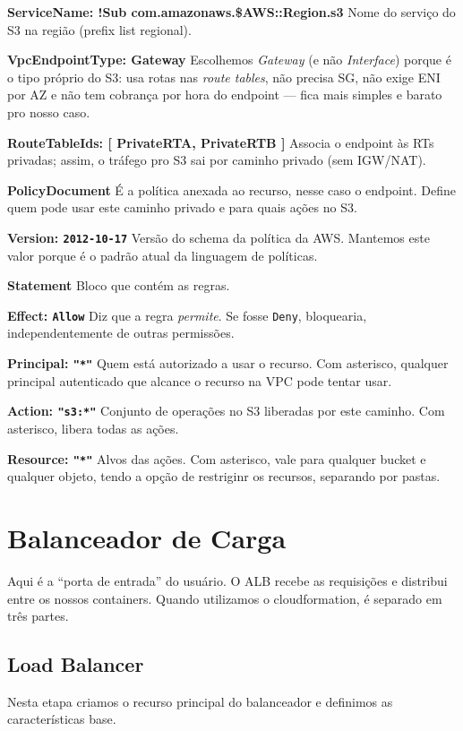 \textbf{ServiceName: !Sub com.amazonaws.\${AWS::Region}.s3} Nome do serviço do S3 na região (prefix list regional).

\textbf{VpcEndpointType: Gateway} Escolhemos \textit{Gateway} (e não \textit{Interface}) porque é o tipo próprio do S3: usa rotas nas \textit{route tables}, não precisa SG, não exige ENI por AZ e não tem cobrança por hora do endpoint — fica mais simples e barato pro nosso caso.

\textbf{RouteTableIds: [ PrivateRTA, PrivateRTB ]} Associa o endpoint às RTs privadas; assim, o tráfego pro S3 sai por caminho privado (sem IGW/NAT).

\textbf{PolicyDocument} É a política anexada ao recurso, nesse caso o endpoint. Define quem pode usar este caminho privado e para quais ações no S3.

\textbf{Version: \texttt{2012-10-17}} Versão do schema da política da AWS. Mantemos este valor porque é o padrão atual da linguagem de políticas.

\textbf{Statement} Bloco que contém as regras.

\textbf{Effect: \texttt{Allow}} Diz que a regra \textit{permite}. Se fosse \texttt{Deny}, bloquearia, independentemente de outras permissões.

\textbf{Principal: \texttt{"*"}} Quem está autorizado a usar o recurso. Com asterisco, qualquer principal autenticado que alcance o recurso na VPC pode tentar usar.

\textbf{Action: \texttt{"s3:*"}} Conjunto de operações no S3 liberadas por este caminho. Com asterisco, libera todas as ações.

\textbf{Resource: \texttt{"*"}} Alvos das ações. Com asterisco, vale para qualquer bucket e qualquer objeto, tendo a opção de restriginr os recursos, separando por pastas.

\section{Balanceador de Carga}
Aqui é a “porta de entrada” do usuário. O ALB recebe as requisições e distribui entre os nossos containers. Quando utilizamos o cloudformation, é separado em três partes.

\subsection{Load Balancer}
Nesta etapa criamos o recurso principal do balanceador e definimos as características base.\\


